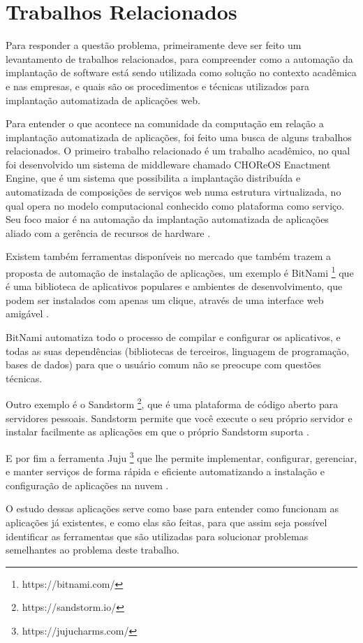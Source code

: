 \section{Trabalhos Relacionados}
\label{section:trabalhos_relacionados}
Para responder a questão problema, primeiramente deve ser feito um levantamento
de trabalhos relacionados, para compreender como a automação da implantação
de software está sendo utilizada como solução no contexto acadêmica e nas empresas, e
quais são os procedimentos e técnicas utilizados para implantação automatizada de
aplicações web.

Para entender o que acontece na comunidade da computação em relação a implantação
automatizada de aplicações, foi feito uma busca de alguns trabalhos relacionados. O primeiro
trabalho relacionado é um trabalho acadêmico, no qual foi
desenvolvido um sistema de middleware chamado CHOReOS Enactment Engine, que é um
sistema que possibilita a implantação distribuída e automatizada de composições
de serviços web numa estrutura virtualizada, no qual opera no modelo
computacional conhecido como plataforma como serviço. Seu foco maior é na automação da 
implantação automatizada de aplicações aliado com a gerência de recursos de 
hardware \cite{leo2014} .

Existem também ferramentas disponíveis no mercado que também trazem a proposta
de automação de instalação de aplicações, um exemplo é BitNami \footnote{https://bitnami.com/} 
que é uma biblioteca de aplicativos populares e ambientes de desenvolvimento, 
que podem ser instalados com apenas um clique, 
através de uma interface web amigável \cite{bitnami}.

BitNami automatiza todo o processo de compilar e configurar os aplicativos, 
e todas as suas dependências (bibliotecas de terceiros, linguagem de programação, 
bases de dados) para que o usuário comum não se preocupe com questões técnicas. 

Outro exemplo é o Sandstorm \footnote{https://sandstorm.io/}, que é uma plataforma de código aberto para servidores
pessoais. Sandstorm permite que você execute o seu próprio servidor e instalar
facilmente as aplicações em que o próprio Sandstorm suporta \cite{sandstormio}.

E por fim a ferramenta Juju \footnote{https://jujucharms.com/} que lhe permite 
implementar, configurar, gerenciar, 
e manter serviços de forma rápida e eficiente automatizando a instalação e 
configuração de aplicações na nuvem \cite{juju}.

O estudo dessas aplicações serve como base para entender como funcionam as aplicações
já existentes, e como elas são feitas, para que assim seja possível identificar
as ferramentas que são utilizadas para solucionar problemas semelhantes ao problema deste
trabalho. 

